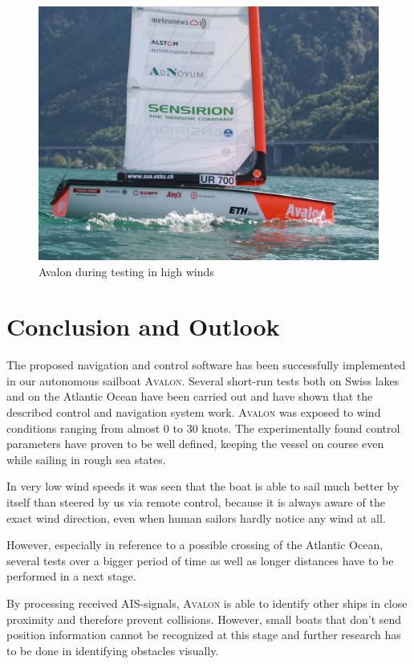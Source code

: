 \begin{figure}[htb]
\centering
\includegraphics[width=0.75\columnwidth]{pics/IMG_0601_papercrop.jpeg}
\caption{Avalon during testing in high winds}
\end{figure}

\section{Conclusion and Outlook}
The proposed navigation and control software has been successfully implemented
in our autonomous sailboat \textsc{Avalon}. Several short-run tests both on
Swiss lakes and on the Atlantic Ocean have been carried out and have shown that the
described control and navigation system work. \textsc{Avalon} was exposed to
wind conditions ranging from almost 0 to 30 knots. The experimentally found
control parameters have proven to be well defined, keeping the vessel on course
even while sailing in rough sea states.

In very low wind speeds it was seen that the boat is able to sail much better
by itself than steered by us via remote control, because it is always aware of
the exact wind direction, even when human sailors hardly notice any wind at
all.

However, especially in reference to a possible crossing of the Atlantic Ocean,
several tests over a bigger period of time as well as longer distances have to
be performed in a next stage. 

By processing received AIS-signals, \textsc{Avalon} is able to identify other
ships in close proximity and therefore prevent collisions. However, small boats
that don't send position information cannot be recognized at this stage and
further research has to be done in identifying obstacles visually.   


